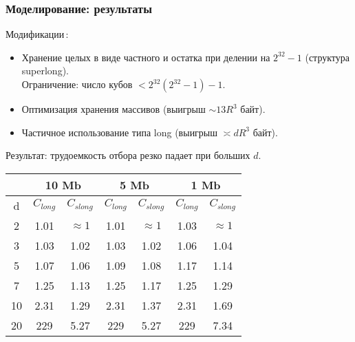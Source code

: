 \documentclass[pdf, intlimits, 9pt, unicode]{beamer} %
\begin{document}
\begin{frame}
    \frametitle{Моделирование: результаты}
    \alert{Модификации\,:}\,
    \begin{itemize}
        \item Хранение целых в виде частного и остатка при делении на
        $2^{32}-1$ (структура superlong).\\ Ограничение: число кубов
        $<2^{32}(2^{32}-1)-1$.
        \item Оптимизация хранения массивов (выигрыш $\sim 13R^3$
        байт).
        \item Частичное использование типа long (выигрыш $\asymp dR^3$
        байт).
    \end{itemize}

    \alert{Результат:} трудоемкость отбора резко падает при больших
    $d$.

    \begin{center}
        \begin{tabular}{|c||c|c||c|c||c|c|}
            \hline
            &  \multicolumn{2}{c||}{10 Mb}&  \multicolumn{2}{c||}{5 Mb}&  \multicolumn{2}{c|}{1 Mb}  \\\hline
            d&$C_{long}$&$C_{slong}$&$C_{long}$&$C_{slong}$&$C_{long}$&$C_{slong}$\\ \hline
            2& 1.01& $\approx1$ &1.01& $\approx1$&1.03 & $\approx1$  \\ \hline
            3& 1.03& 1.02&1.03&1.02&1.06&1.04\\ \hline
            5& 1.07&1.06&1.09&1.08&1.17&1.14\\\hline
            7&1.25&1.13&1.25& 1.17&1.25&1.29\\\hline
            10&2.31&1.29  &2.31&1.37&2.31&1.69\\\hline
            20&229&5.27  &229&5.27&229&7.34\\\hline
        \end{tabular}
    \end{center}
\end{frame}
\end{document}
